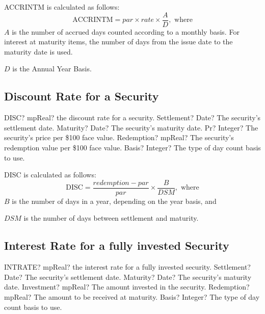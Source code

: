 \vspace{0.3cm}
ACCRINTM is calculated as follows: 
\begin{equation}
	\text{ACCRINTM} = par \times rate \times \frac{A}{D} , \text{ where}
\end{equation}
$A$ is the number of accrued days counted according to a monthly basis. For interest at maturity items, the number of days from the issue date to the maturity date is used.

$D$ is the Annual Year Basis.






\subsection{Discount Rate for a Security}


\begin{mpFunctionsExtract}
	\mpWorksheetFunctionFiveNotImplemented
	{DISC? mpReal? the discount rate for a security.}
	{Settlement? Date?  The security's settlement date.}
	{Maturity? Date? The security's maturity date.}
	{Pr? Integer?  The security's price per \$100 face value.}
	{Redemption? mpReal? The security's redemption value per \$100 face value.}
	{Basis? Integer? The type of day count basis to use.}
\end{mpFunctionsExtract}

\vspace{0.3cm}
DISC is calculated as follows: 
\begin{equation}
	\text{DISC} = \frac{redemption - par}{par} \times \frac{B}{DSM} , \text{ where}
\end{equation}
$B$ is the number of days in a year, depending on the year basis, and

$DSM$ is the number of days between settlement and maturity.






\subsection{Interest Rate for a fully invested Security}


\begin{mpFunctionsExtract}
	\mpWorksheetFunctionFiveNotImplemented
	{INTRATE? mpReal? the interest rate for a fully invested security.}
	{Settlement? Date?  The security's settlement date.}
	{Maturity? Date? The security's maturity date.}
	{Investment? mpReal?  The amount invested in the security.}
	{Redemption? mpReal? The amount to be received at maturity.}
	{Basis? Integer? The type of day count basis to use.}
\end{mpFunctionsExtract}

